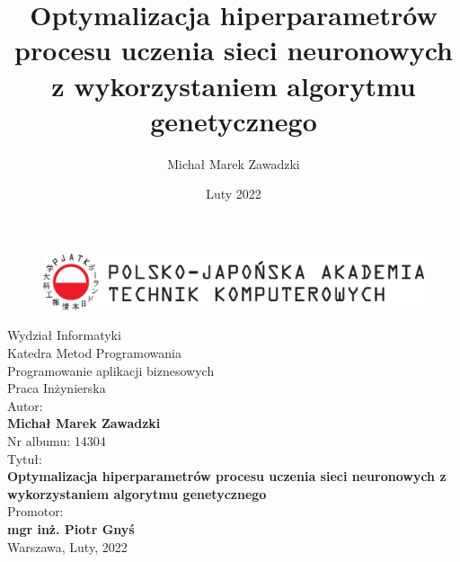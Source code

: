 \documentclass[a4paper,11pt]{article}
\title{Optymalizacja hiperparametrów procesu uczenia sieci neuronowych z wykorzystaniem algorytmu genetycznego}
\author{Michał Marek Zawadzki}
\date{Luty 2022}
\begin{document}
    \thispagestyle{empty}

    \begin{figure}[H]
        \label{fig:pjatk_logo}
        \centering
        \includegraphics[width=\textwidth]{pjatk_logo}
    \end{figure}

    \begin{center}

        \vspace{1.3cm}
        \large
        Wydział Informatyki \\

        \vspace{0.4cm}
        \large
        Katedra Metod Programowania \\

        \vspace{0.4cm}
        \large
        Programowanie aplikacji biznesowych \\

        \vspace{1cm}
        \LARGE
        Praca Inżynierska \\

        \vspace{1.3cm}
        \normalsize
        Autor: \\
        \vspace{.3cm}
        \large
        \textbf{Michał Marek Zawadzki} \\
        Nr albumu: 14304 \\

        \vspace{1.3cm}
        \normalsize
        Tytuł: \\
        \vspace{.3cm}
        \LARGE
        \textbf{Optymalizacja hiperparametrów procesu uczenia sieci neuronowych z wykorzystaniem algorytmu genetycznego} \\

        \vspace{1.3cm}
        \normalsize
        Promotor: \\
        \vspace{.3cm}
        \large
        \textbf{mgr inż. Piotr Gnyś} \\

        \vspace{2.3cm}
        \normalsize
        Warszawa, Luty, 2022 \\

    \end{center}
\end{document}
